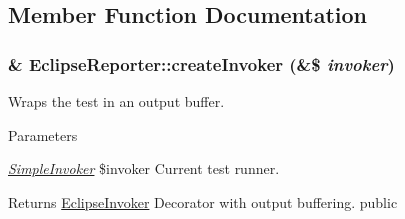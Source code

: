 \subsection{Member Function Documentation}
\hypertarget{class_eclipse_reporter_a251879a7dcdbaf023091c18dce8d58f2}{
\subsubsection[{createInvoker}]{\setlength{\rightskip}{0pt plus 5cm}\& EclipseReporter::createInvoker (\&\$ {\em invoker})}}
\label{class_eclipse_reporter_a251879a7dcdbaf023091c18dce8d58f2}
Wraps the test in an output buffer. 
\begin{DoxyParams}{Parameters}
\item[{\em \hyperlink{class_simple_invoker}{SimpleInvoker}}]\$invoker Current test runner. \end{DoxyParams}
\begin{DoxyReturn}{Returns}
\hyperlink{class_eclipse_invoker}{EclipseInvoker} Decorator with output buffering.  public 
\end{DoxyReturn}


